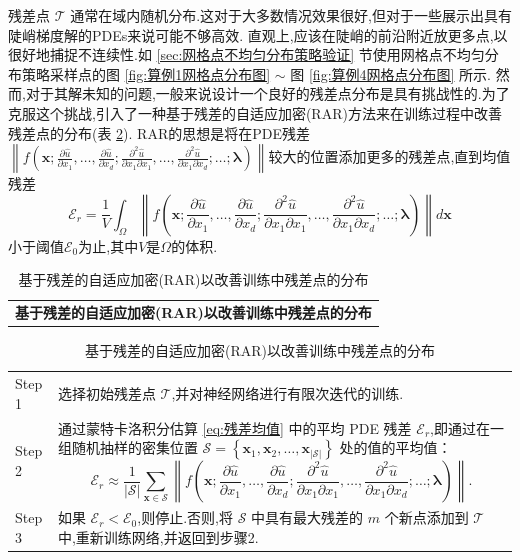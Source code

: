 \documentclass{Sichuan Normal University}
\begin{document}
残差点 $\mathcal{T}$ 通常在域内随机分布.这对于大多数情况效果很好,但对于一些展示出具有陡峭梯度解的PDEs来说可能不够高效.
直观上,应该在陡峭的前沿附近放更多点,以很好地捕捉不连续性.如 \ref{sec:网格点不均匀分布策略验证} 节使用网格点不均匀分布策略采样点的图 \ref{fig:算例1网格点分布图} $\sim$ 图 \ref{fig:算例4网格点分布图} 所示. 
然而,对于其解未知的问题,一般来说设计一个良好的残差点分布是具有挑战性的.为了克服这个挑战,引入了一种基于残差的自适应加密(RAR)方法\cite{luDeepXDEDeepLearning2021}来在训练过程中改善残差点的分布(表 \ref{tab:RAR}).
RAR的思想是将在PDE残差$\left\|f\left(\mathbf{x} ; \frac{\partial \hat{u}}{\partial x_1}, \ldots, \frac{\partial \hat{u}}{\partial x_d} ; \frac{\partial^2 \hat{u}}{\partial x_1 \partial x_1}, \ldots, \frac{\partial^2 \hat{u}}{\partial x_1 \partial x_d} ; \ldots ; \boldsymbol{\lambda}\right)\right\|$较大的位置添加更多的残差点,直到均值残差
\begin{equation}
\mathcal{E}_r=\frac{1}{V} \int_{\Omega}\left\|f\left(\mathbf{x} ; \frac{\partial \hat{u}}{\partial x_1}, \ldots, \frac{\partial \hat{u}}{\partial x_d} ; \frac{\partial^2 \hat{u}}{\partial x_1 \partial x_1}, \ldots, \frac{\partial^2 \hat{u}}{\partial x_1 \partial x_d} ; \ldots ; \boldsymbol{\lambda}\right)\right\| d \mathbf{x}
\label{eq:残差均值}
\end{equation}
小于阈值$\mathcal{E}_0$为止,其中$V$是$\Omega$的体积.

\begin{table}[H]
    \centering
    \caption{基于残差的自适应加密(RAR)以改善训练中残差点的分布}
    \begin{tabular}{p{}}
    \toprule
    \textbf{基于残差的自适应加密(RAR)以改善训练中残差点的分布} \\
\end{tabular}
    \begin{tabular}{p{}p{}}
    \midrule
    Step 1 & 选择初始残差点 $\mathcal{T}$,并对神经网络进行有限次迭代的训练. \\
    Step 2 & 通过蒙特卡洛积分估算 \eqref{eq:残差均值} 中的平均 PDE 残差 $\mathcal{E}_r$,即通过在一组随机抽样的密集位置 $\mathcal{S}=\left\{\mathbf{x}_1, \mathbf{x}_2, \ldots, \mathbf{x}_{|\mathcal{S}|}\right\}$ 处的值的平均值：
    \[
    \mathcal{E}_r \approx \frac{1}{|\mathcal{S}|} \sum_{\mathbf{x} \in \mathcal{S}}\left\|f\left(\mathbf{x} ; \frac{\partial \hat{u}}{\partial x_1}, \ldots, \frac{\partial \hat{u}}{\partial x_d} ; \frac{\partial^2 \hat{u}}{\partial x_1 \partial x_1}, \ldots, \frac{\partial^2 \hat{u}}{\partial x_1 \partial x_d} ; \ldots ; \boldsymbol{\lambda}\right)\right\| .
    \]
    \\
    Step 3 & 如果 $\mathcal{E}_r < \mathcal{E}_0$,则停止.否则,将 $\mathcal{S}$ 中具有最大残差的 $m$ 个新点添加到 $\mathcal{T}$ 中,重新训练网络,并返回到步骤2. \\
    \bottomrule
    \end{tabular}
    \label{tab:RAR}
\end{table}
\end{document}
